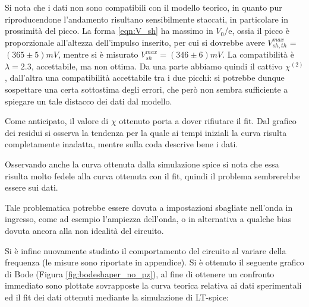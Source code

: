 \documentclass{article}
\begin{document}
Si nota che i dati non sono compatibili con il modello teorico, in quanto pur riproducendone l'andamento risultano sensibilmente 
staccati, in particolare in prossimità del picco. La forma \ref{eqn:V_sh} ha massimo in $V_0$/e, ossia il picco è proporzionale all'altezza dell'impulso
inserito, per cui si dovrebbe avere $V_{sh,th}^{max}$ = $(365 \pm 5) mV $, mentre si è misurato  $V_{sh}^{max}=(346 \pm 6)mV$. La compatibilità è $\lambda=2.3$,
accettabile, ma non ottima. Da una parte abbiamo quindi il cattivo $\chi^{(2)}$, dall'altra una compatibilità accettabile tra i due picchi: si potrebbe dunque 
sospettare una certa sottostima degli errori, che però non sembra sufficiente a spiegare un tale distacco dei dati dal modello.

Come anticipato, il valore di $\chi$ ottenuto porta a dover rifiutare il 
fit. Dal grafico dei residui si osserva la tendenza per la quale 
ai tempi iniziali la curva risulta completamente inadatta, mentre sulla coda descrive bene
i dati.

Osservando anche la curva ottenuta dalla simulazione spice si nota che 
essa risulta molto fedele alla curva ottenuta con il fit, quindi il problema
sembrerebbe essere sui dati.

Tale problematica potrebbe essere dovuta a impostazioni sbagliate nell'onda in ingresso,
come ad esempio l'ampiezza dell'onda, o in alternativa
a qualche bias dovuta ancora alla non idealità del circuito.


Si è infine nuovamente studiato il comportamento del circuito al variare della frequenza (le misure sono riportate in appendice). Si è 
ottenuto il seguente grafico di Bode (Figura \ref{fig:bodeshaper_no_pz}), al fine di ottenere un confronto immediato sono plottate 
sovrapposte la curva teorica relativa ai dati sperimentali ed il fit dei dati ottenuti mediante la simulazione di LT-spice:
\end{document}
